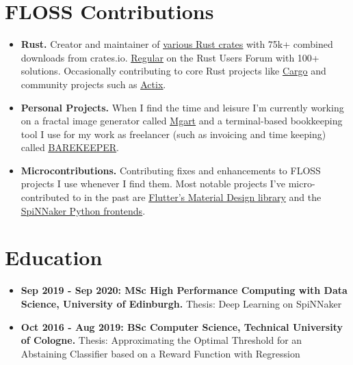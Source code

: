 \documentclass[10pt]{article}
\begin{document}
\section*{FLOSS Contributions}

\begin{itemize}[label={}, leftmargin=*]

\item \textbf{Rust.} Creator and maintainer of
  \underline{\href{https://crates.io/users/jofas}{various Rust crates}}
  with 75k+ combined downloads from crates.io.
  \underline{\href{https://users.rust-lang.org/u/jofas/summary}{Regular}}
  on the Rust Users Forum with 100+ solutions.
  Occasionally contributing to core Rust projects like
  \underline{\href{https://github.com/rust-lang/cargo}{Cargo}} and
  community projects such as
  \underline{\href{https://github.com/actix/}{Actix}}.

\item \textbf{Personal Projects.} When I find the time and leisure I'm
  currently working on a fractal image generator called
  \underline{\href{https://github.com/jofas/mgart}{Mgart}}
  and a terminal-based bookkeeping tool I use for my work as
  freelancer (such as invoicing and time keeping) called
  \underline{\href{https://github.com/jofas/BAREKEEPER}{BAREKEEPER}}.

\item \textbf{Microcontributions.} Contributing fixes and enhancements
  to FLOSS projects I use whenever I find them.
  Most notable projects I've micro-contributed to in the past are
  \underline{\href{https://github.com/flutter/flutter}{Flutter's Material Design library}}
  and the
  \underline{\href{https://github.com/SpiNNakerManchester}{SpiNNaker Python frontends}}.

\end{itemize}

\section*{Education}

\begin{itemize}[label={}, leftmargin=*]

\item \textbf{Sep 2019 - Sep 2020: MSc High Performance Computing with Data
  Science, University of Edinburgh.} Thesis: Deep Learning on SpiNNaker

\item \textbf{Oct 2016 - Aug 2019: BSc Computer Science, Technical
  University of Cologne.} Thesis: Approximating the Optimal Threshold
  for an Abstaining Classifier based on a Reward Function with Regression

\end{itemize}
\end{document}
